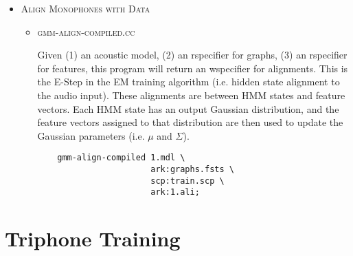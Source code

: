 \documentclass[10pt,a4paper]{article}
\begin{document}
\begin{itemize}
\begin{itemize}
  \end{itemize}

\vspace{1cm}
\item \textsc{Align Monophones with Data}
  \begin{itemize}
    \vspace{.25cm}
  \item \textsc{gmm-align-compiled.cc}

   Given (1) an acoustic model, (2) an rspecifier for graphs, (3) an rspecifier for features, this program will return an wspecifier for alignments. This is the E-Step in the EM training algorithm (i.e. hidden state alignment to the audio input). These alignments are between HMM states and feature vectors. Each HMM state has an output Gaussian distribution, and the feature vectors assigned to that distribution are then used to update the Gaussian parameters (i.e. $\mu$ and $\Sigma$). \\
    
    \begin{verbatim}
    gmm-align-compiled 1.mdl \
                       ark:graphs.fsts \
                       scp:train.scp \
                       ark:1.ali;
    \end{verbatim}
  \end{itemize}
\end{itemize}

\vspace{1cm}

\section*{\large{Triphone Training}}
\end{document}
